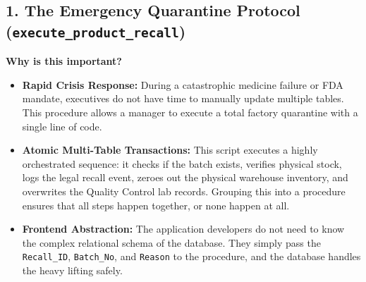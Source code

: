 \documentclass[12pt, a4paper]{article}
\begin{document}
\subsection{1. The Emergency Quarantine Protocol (\texttt{execute\_product\_recall})}

\textbf{Why is this important?}
\begin{itemize}
    \item[$\rightarrow$] \textbf{Rapid Crisis Response:} During a catastrophic medicine failure or FDA mandate, executives do not have time to manually update multiple tables. This procedure allows a manager to execute a total factory quarantine with a single line of code.
    \item[$\rightarrow$] \textbf{Atomic Multi-Table Transactions:} This script executes a highly orchestrated sequence: it checks if the batch exists, verifies physical stock, logs the legal recall event, zeroes out the physical warehouse inventory, and overwrites the Quality Control lab records. Grouping this into a procedure ensures that all steps happen together, or none happen at all.
    \item[$\rightarrow$] \textbf{Frontend Abstraction:} The application developers do not need to know the complex relational schema of the database. They simply pass the \texttt{Recall\_ID}, \texttt{Batch\_No}, and \texttt{Reason} to the procedure, and the database handles the heavy lifting safely.
\end{itemize}
\end{document}
